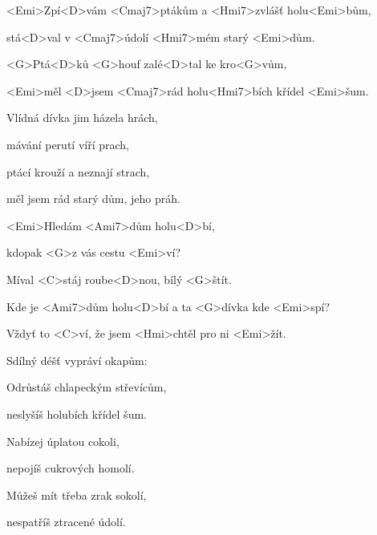 

\zs
<Emi>Zpí<D>vám <Cmaj7>ptákům a <Hmi7>zvlášť holu<Emi>bům,

stá<D>val v <Cmaj7>údolí <Hmi7>mém starý <Emi>dům.

<G>Ptá<D>ků <G>houf zalé<D>tal ke kro<G>vům,

<Emi>měl <D>jsem <Cmaj7>rád holu<Hmi7>bích křídel <Emi>šum.
\ks

\zs
Vlídná dívka jim házela hrách,

mávání perutí víří prach,

ptácí krouží a neznají strach,

měl jsem rád starý dům, jeho práh.
\ks

\zr
<Emi>Hledám <Ami7>dům holu<D>bí,

kdopak <G>z vás cestu <Emi>ví?

Míval <C>stáj roube<D>nou, bílý <G>štít.

Kde je <Ami7>dům holu<D>bí a ta <G>dívka kde <Emi>spí?

Vždyť to <C>ví, že jsem <Hmi>chtěl pro ni <Emi>žít.
\kr

\zs
Sdílný déšť vypráví okapům:


Odrůstáš chlapeckým střevícům,

neslyšíš holubích křídel šum.
\ks

\zs
Nabízej úplatou cokoli,

nepojíš cukrových homolí.

Můžeš mít třeba zrak sokolí,

nespatříš ztracené údolí.
\ks

\zr \kr

\kp





